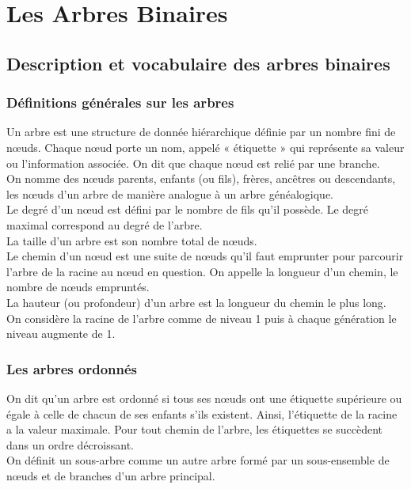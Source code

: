 \documentclass{report}
\begin{document}
\section{Les Arbres Binaires}
\subsection{Description et vocabulaire des arbres binaires}
\subsubsection{Définitions générales sur les arbres}

Un arbre est une structure de donnée hiérarchique définie par un nombre fini de nœuds. Chaque nœud porte un nom, appelé « étiquette » qui représente sa valeur ou l'information associée. On dit que chaque nœud est relié par une branche. \\
On nomme des nœuds parents, enfants (ou fils), frères, ancêtres ou descendants, les nœuds d'un arbre de manière analogue à un arbre généalogique.\\
Le degré d'un nœud est défini par le nombre de fils qu'il possède. Le degré maximal correspond au degré de l'arbre.\\
La taille d'un arbre est son nombre total de nœuds.\\
Le chemin d'un nœud est une suite de nœuds qu'il faut emprunter pour parcourir l'arbre de la racine au nœud en question. On appelle la longueur d'un chemin, le nombre de nœuds empruntés.\\
La hauteur (ou profondeur) d'un arbre est la longueur du chemin le plus long.\\
On considère la racine de l'arbre comme de niveau 1 puis à chaque génération le niveau augmente de 1.\\

\subsubsection{Les arbres ordonnés}

On dit qu'un arbre est ordonné si tous ses nœuds ont une étiquette supérieure ou égale à celle de chacun de ses enfants s'ils existent. Ainsi, l'étiquette de la racine a la valeur maximale. Pour tout chemin de l'arbre, les étiquettes se succèdent dans un ordre décroissant.\\
On définit un sous-arbre comme un autre arbre formé par un sous-ensemble de nœuds et de branches d'un arbre principal.\\
\end{document}
